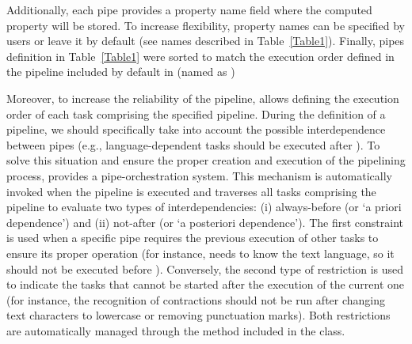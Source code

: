 Additionally, each pipe provides a property name field where the computed property will be stored. To increase flexibility, property names can be specified by users or leave it by default (see names described in Table~\ref{Table1}). Finally, pipes definition in Table~\ref{Table1} were sorted to match the execution order defined in the pipeline included by default in  (named as )

Moreover, to increase the reliability of the pipeline,  allows defining the execution order of each task comprising the specified pipeline. During the definition of a pipeline, we should specifically take into account the possible interdependence between pipes (e.g., language-dependent tasks should be executed after ). To solve this situation and ensure the proper creation and execution of the pipelining process,  provides a pipe-orchestration system. This mechanism is automatically invoked when the pipeline is executed and traverses all tasks comprising the pipeline to evaluate two types of interdependencies: (i) always-before (or ‘a priori dependence’) and (ii) not-after (or ‘a posteriori dependence’). The first constraint is used when a specific pipe requires the previous execution of other tasks to ensure its proper operation (for instance,  needs to know the text language, so it should not be executed before ). Conversely, the second type of restriction is used to indicate the tasks that cannot be started after the execution of the current one (for instance, the recognition of contractions should not be run after changing text characters to lowercase or removing punctuation marks). Both restrictions are automatically managed through the  method included in the  class. 

